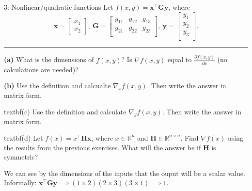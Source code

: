 

\begin{problem}{3: Nonlinear/quadratic functions}
Let $f(x,y)=\mathbf{x^{\top}Gy}$, where
\[
  \mathbf{x} = \begin{bmatrix}
    x_1 \\ x_2
  \end{bmatrix}
  ,\
  \mathbf{G} = \begin{bmatrix}
    g_{11} & g_{12} & g_{13} \\
    g_{21} & g_{22} & g_{23} \\
  \end{bmatrix}
  ,\
  \mathbf{y} = \begin{bmatrix}
    y_1 \\ y_2 \\ y_3\\
  \end{bmatrix}
  .\]


\medskip

\hrule
\textbf{(a)} What is the dimensions of $f(x,y)$? Is $\nabla f(x,y)$ equal to $\frac{\partial f(x,y)}{\partial x}$ (no calculations are needed)?

\medskip


\textbf{(b)}
Use the definition and calcualte $\nabla_x f(x,y)$. Then write the answer in matrix form.

\medskip

textbf{(c)} Use the definition and calculate $\nabla_y f(x,y)$. Then write the answer in matrix form.

\medskip

textbf{(d)} Let $f(x) = x^{\top}\mathbf{Hx}$, where $x \in \mathbb{R}^{n}$ and $\mathbf{H} \in \mathbb{R}^{n \times n}$. Find $\nabla f(x)$ using the results from
the previous exercises. What will the answer be if $\mathbf{H}$ is symmetric?
\end{problem}



We can see by the dimensions of the inputs that the ouput will be a scalar value.
Informally: $\mathbf{x}^{\top} \mathbf{G} \mathbf{y} \implies (1\times 2)(2\times 3)(3 \times 1) \implies 1$.

\SUBTASK{b}

